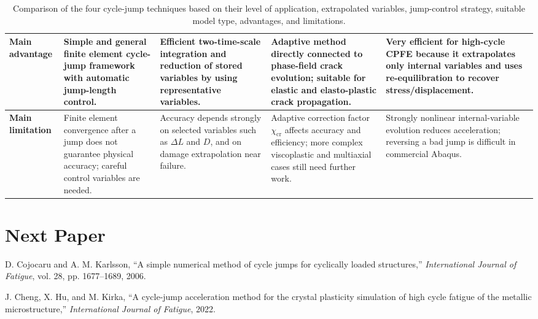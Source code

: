 ﻿\documentclass[11pt,a4paper]{article}
\begin{document}
\begin{landscape}
\begin{table}[htbp]
\begin{tabularx}{\linewidth}{p{3.1cm} Y Y Y Y}
\midrule

\textbf{Main advantage}
&
Simple and general finite element cycle-jump framework with automatic jump-length control.
&
Efficient two-time-scale integration and reduction of stored variables by using representative variables.
&
Adaptive method directly connected to phase-field crack evolution; suitable for elastic and elasto-plastic crack propagation.
&
Very efficient for high-cycle CPFE because it extrapolates only internal variables and uses re-equilibration to recover stress/displacement.
\\

\midrule

\textbf{Main limitation}
&
Finite element convergence after a jump does not guarantee physical accuracy; careful control variables are needed.
&
Accuracy depends strongly on selected variables such as $\Delta L$ and $D$, and on damage extrapolation near failure.
&
Adaptive correction factor $\chi_{\mathrm{cr}}$ affects accuracy and efficiency; more complex viscoplastic and multiaxial cases still need further work.
&
Strongly nonlinear internal-variable evolution reduces acceleration; reversing a bad jump is difficult in commercial Abaqus.
\\

\bottomrule
\end{tabularx}
\caption{Comparison of the four cycle-jump techniques based on their level of application, extrapolated variables, jump-control strategy, suitable model type, advantages, and limitations.}
\label{tab:cycle_jump_comparison_papers_as_columns}
\end{table}
\end{landscape}

\section{Next Paper}


\begin{thebibliography}{9}

D. Cojocaru and A. M. Karlsson,
``A simple numerical method of cycle jumps for cyclically loaded structures,''
\textit{International Journal of Fatigue},
vol. 28, pp. 1677--1689, 2006.

J. Cheng, X. Hu, and M. Kirka,
``A cycle-jump acceleration method for the crystal plasticity simulation of high cycle fatigue of the metallic microstructure,''
\textit{International Journal of Fatigue}, 2022.

\end{thebibliography}
\end{document}
